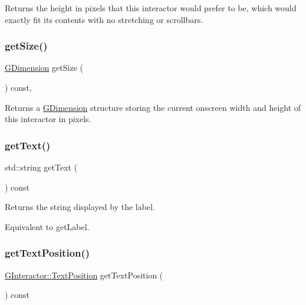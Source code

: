 Returns the height in pixels that this interactor would prefer to be, which would exactly fit its contents with no stretching or scrollbars. 

\mbox{\label{classsgl_1_1GInteractor_a7b4eec96a2bdc6420695d5796a78eea9}} 
\subsubsection{\texorpdfstring{get\+Size()}{getSize()}}
{\footnotesize\ttfamily \mbox{\hyperlink{structsgl_1_1GDimension}{G\+Dimension}} get\+Size (\begin{DoxyParamCaption}{ }\end{DoxyParamCaption}) const\hspace{0.3cm}{\ttfamily [virtual]}, {\ttfamily [inherited]}}



Returns a \mbox{\hyperlink{structsgl_1_1GDimension}{G\+Dimension}} structure storing the current onscreen width and height of this interactor in pixels. 

\mbox{\label{classsgl_1_1GLabel_aff553c50924b836c29f146ed34a7c6ec}} 
\subsubsection{\texorpdfstring{get\+Text()}{getText()}}
{\footnotesize\ttfamily std\+::string get\+Text (\begin{DoxyParamCaption}{ }\end{DoxyParamCaption}) const\hspace{0.3cm}{\ttfamily [virtual]}}



Returns the string displayed by the label. 

Equivalent to get\+Label. \mbox{\label{classsgl_1_1GLabel_a3fc623df3ced62aca93fc344c2426899}} 
\subsubsection{\texorpdfstring{get\+Text\+Position()}{getTextPosition()}}
{\footnotesize\ttfamily \mbox{\hyperlink{classsgl_1_1GInteractor_a8e0d441725a81d2bbdebbea09078260e}{G\+Interactor\+::\+Text\+Position}} get\+Text\+Position (\begin{DoxyParamCaption}{ }\end{DoxyParamCaption}) const\hspace{0.3cm}{\ttfamily [virtual]}}



